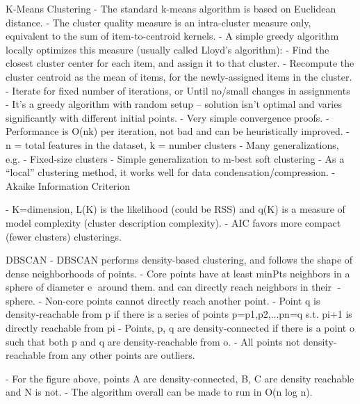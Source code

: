 \documentclass[3pt,landscape]{article}
\begin{document}
\begin{multicols}{3}
K-Means Clustering
- The standard k-means algorithm is based on Euclidean distance.
- The cluster quality measure is an intra-cluster measure only, equivalent to the sum of item-to-centroid kernels. 
- A simple greedy algorithm locally optimizes this measure (usually called Lloyd’s algorithm):
  - Find the closest cluster center for each item, and assign it to that cluster.
  - Recompute the cluster centroid as the mean of items, for the newly-assigned items in the cluster. 
  - Iterate for fixed number of iterations, or Until no/small changes in assignments 
  - It’s a greedy algorithm with random setup – solution isn’t optimal and varies significantly with different initial points.
- Very simple convergence proofs.
- Performance is O(nk) per iteration, not bad and can be heuristically improved.
  - n = total features in the dataset, k = number clusters
- Many generalizations, e.g.
  - Fixed-size clusters
  - Simple generalization to m-best soft clustering
- As a “local” clustering method, it works well for data condensation/compression. 
- Akaike Information Criterion 

  - K=dimension, L(K) is the likelihood (could be RSS) and q(K) is a measure of model complexity (cluster description complexity).
  - AIC favors more compact (fewer clusters) clusterings. 
  
DBSCAN
- DBSCAN performs density-based clustering, and follows the shape of dense neighborhoods of points. 
- Core points have at least minPts neighbors in a sphere of diameter e around them. and can directly reach neighbors in their -sphere.
- Non-core points cannot directly reach another point.
- Point q is density-reachable from p if there is a series of points p=p1,p2,...pn=q s.t. pi+1 is directly reachable from pi
- Points, p, q are density-connected if there is a point o such that both p and q are density-reachable from o. 
- All points not density-reachable from any other points are outliers. 

  - For the figure above, points A are density-connected, B, C are density reachable and N is not. 
- The algorithm overall can be made to run in O(n log n). 


\end{multicols}
\end{document}
